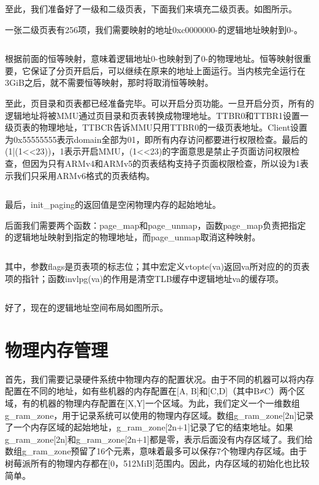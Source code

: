 \documentclass[main.tex]{subfiles}
\begin{document}
\begin{CJK*}{UTF8}{song}
至此，我们准备好了一级和二级页表，下面我们来填充二级页表。如图所示。

一张二级页表有256项，我们需要映射的地址0xc0000000-的逻辑地址映射到0-。

\inputminted[firstline=175,lastline=180,linenos,numbersep=5pt,frame=lines,framesep=2mm]{c}{src/chapter04/kernel/machdep.c}

根据前面的恒等映射，意味着逻辑地址0-也映射到了0-的物理地址。恒等映射很重要，它保证了分页开启后，可以继续在原来的地址上面运行。当内核完全运行在3GiB之后，就不需要恒等映射，那时将取消恒等映射。


至此，页目录和页表都已经准备完毕。可以开启分页功能。一旦开启分页，所有的逻辑地址将被MMU通过页目录和页表转换成物理地址。TTBR0和TTBR1设置一级页表的物理地址，TTBCR告诉MMU只用TTBR0的一级页表地址。Client设置为0x55555555表示domain全部为01，即所有内存访问都要进行权限检查。最后的 (1|(1<<23))，1表示开启MMU，(1<<23)的字面意思是禁止子页面访问权限检查，但因为只有ARMv4和ARMv5的页表结构支持子页面权限检查，所以设为1表示我们只采用ARMv6格式的页表结构。

\inputminted[firstline=182,lastline=205,linenos,numbersep=5pt,frame=lines,framesep=2mm]{c}{src/chapter04/kernel/machdep.c}

最后，init\_paging的返回值是空闲物理内存的起始地址。

后面我们需要两个函数：page\_map和page\_unmap，函数page\_map负责把指定的逻辑地址映射到指定的物理地址，而page\_unmap取消这种映射。

\inputminted[firstline=239,lastline=263,linenos,numbersep=5pt,frame=lines,framesep=2mm]{c}{src/chapter04/kernel/page.c}

其中，参数flags是页表项的标志位；其中宏定义vtopte(va)返回va所对应的的页表项的指针；函数invlpg(va)的作用是清空TLB缓存中逻辑地址va的缓存项。

\inputminted[firstline=59,lastline=60,linenos,numbersep=5pt,frame=lines,framesep=2mm]{c}{src/chapter04/kernel/kernel.h}

好了，现在的逻辑地址空间布局如图所示。

\section{物理内存管理}
首先，我们需要记录硬件系统中物理内存的配置状况。由于不同的机器可以将内存配置在不同的地址，如有些机器的内存配置在[A, B]和[C,D]（其中B≠C）两个区域，有的机器的物理内存配置在[X,Y]一个区域。为此，我们定义一个一维数组g\_ram\_zone，用于记录系统可以使用的物理内存区域。数组g\_ram\_zone[2n]记录了一个内存区域的起始地址，g\_ram\_zone[2n+1]记录了它的结束地址。如果g\_ram\_zone[2n]和g\_ram\_zone[2n+1]都是零，表示后面没有内存区域了。我们给数组g\_ram\_zone预留了16个元素，意味着最多可以保存7个物理内存区域。由于树莓派所有的物理内存都在[0，512MiB]范围内。因此，内存区域的初始化也比较简单。


\end{CJK*}
\end{document}
